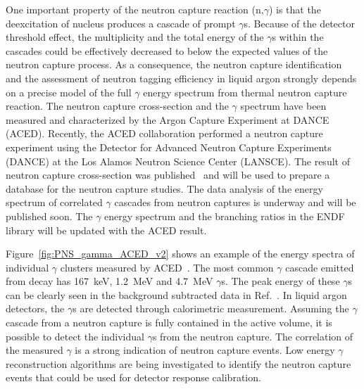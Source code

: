 One important property of the neutron capture reaction (n,$\gamma$) is that the deexcitation of  nucleus produces a cascade of prompt $\gamma$s. Because of the detector threshold effect, the multiplicity and the
total energy of the $\gamma$s within the cascades could be effectively decreased to below the expected values of the neutron capture process. As a consequence, the neutron capture identification and the assessment of neutron tagging efficiency in liquid argon strongly depends on a precise model of the full $\gamma$ energy spectrum from thermal neutron capture reaction. The neutron capture cross-section and the $\gamma$ spectrum have been measured and characterized by the Argon Capture Experiment at DANCE (ACED). Recently, the ACED collaboration performed a neutron capture experiment using the Detector for Advanced Neutron Capture Experiments (DANCE) at the Los Alamos Neutron Science Center (LANSCE). The result of neutron capture cross-section was published~\cite{Fischer:2019qfr} and will be used to prepare a database for the neutron capture studies. The data analysis of the energy spectrum of correlated $\gamma$ cascades from neutron captures is underway and will be published soon. 
The $\gamma$ energy spectrum and the branching ratios in the ENDF library will be updated with the ACED result. 

Figure~\ref{fig:PNS_gamma_ACED_v2} shows an example of the energy spectra of individual $\gamma$ clusters measured by ACED~\cite{Fischer:2019qfr}. The most common $\gamma$ cascade emitted from  decay has \SI{167}{keV}, \SI{1.2}{MeV} and \SI{4.7}{MeV} $\gamma$s. The peak energy of these $\gamma$s can be clearly seen in the background subtracted data in Ref.~\cite{Fischer:2019qfr}. In liquid argon detectors, the $\gamma$s are detected through calorimetric measurement. Assuming the $\gamma$ cascade from a neutron capture is fully contained in the active volume, it is possible to detect the individual $\gamma$s from the neutron capture. The correlation of the measured $\gamma$ is a strong indication of neutron capture events. Low energy $\gamma$ reconstruction algorithms are being investigated to identify the neutron capture events that could be used for detector response calibration. 

